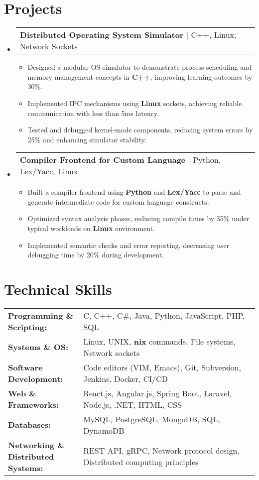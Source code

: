 \documentclass[letterpaper,11pt]{article}
\makeatletter
\newcommand{\resumeItem}[1]{
  \item\footnotesize{
    {#1 \vspace{-2pt}}
  }
}
\newcommand{\resumeProjectHeading}[2]{
    \item
    \begin{tabular*}{1.001\textwidth}{l@{\extracolsep{\fill}}r}
      \small#1 & \textbf{\small #2}\\
    \end{tabular*}\vspace{-7pt}
}
\newcommand{\resumeSubHeadingListStart}{\begin{itemize}[leftmargin=0pt, label={}]}
\newcommand{\resumeSubHeadingListEnd}{\end{itemize}}
\newcommand{\resumeItemListStart}{\begin{itemize}[leftmargin=*]}
\newcommand{\resumeItemListEnd}{\end{itemize}\vspace{-5pt}}
\makeatother
\begin{document}
\section{Projects}
    \vspace{-5pt}
    \resumeSubHeadingListStart
      \resumeProjectHeading
          {\textbf{Distributed Operating System Simulator} | C++, Linux, Network Sockets}
          {}
          \resumeItemListStart
              \resumeItem{Designed a modular OS simulator to demonstrate process scheduling and memory management concepts in \textbf{C++}, improving learning outcomes by 30\%.}
              \resumeItem{Implemented IPC mechanisms using \textbf{Linux} sockets, achieving reliable communication with less than 5ms latency.}
              \resumeItem{Tested and debugged kernel-mode components, reducing system errors by 25\% and enhancing simulator stability.}
          \resumeItemListEnd
          \vspace{-16pt}
      \resumeProjectHeading
          {\textbf{Compiler Frontend for Custom Language} | Python, Lex/Yacc, Linux}
          {}
          \resumeItemListStart
              \resumeItem{Built a compiler frontend using \textbf{Python} and \textbf{Lex/Yacc} to parse and generate intermediate code for custom language constructs.}
              \resumeItem{Optimized syntax analysis phases, reducing compile times by 35\% under typical workloads on \textbf{Linux} environment.}
              \resumeItem{Implemented semantic checks and error reporting, decreasing user debugging time by 20\% during development.}
          \resumeItemListEnd 
    \resumeSubHeadingListEnd
\vspace{-10pt}
\section{Technical Skills}
        \vspace{-14pt}
        \begin{table}[h]
            \footnotesize
            \begin{tabular}{p{0.3\linewidth} p{0.7\linewidth}}
                \textbf{Programming \& Scripting:} & C, C++, C\#, Java, Python, JavaScript, PHP, SQL \\
                \textbf{Systems \& OS:} & Linux, UNIX, \textbf{nix} commands, File systems, Network sockets \\
                \textbf{Software Development:} & Code editors (VIM, Emacs), Git, Subversion, Jenkins, Docker, CI/CD \\
                \textbf{Web \& Frameworks:} & React.js, Angular.js, Spring Boot, Laravel, Node.js, .NET, HTML, CSS \\
                \textbf{Databases:} & MySQL, PostgreSQL, MongoDB, SQL, DynamoDB \\
                \textbf{Networking \& Distributed Systems:} & REST API, gRPC, Network protocol design, Distributed computing principles \\
            \end{tabular}
        \end{table}
\end{document}
